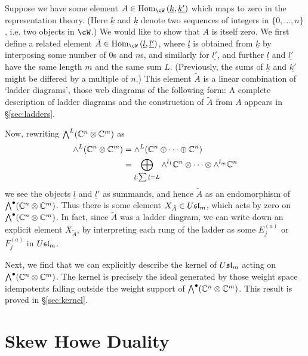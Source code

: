 \documentclass[11pt,leqno]{article}
\begin{document}
Suppose we have some element $A \in \Hom{\cW}{\underline{k}}{\underline{k'}}$ which maps to zero in the representation theory. (Here $\underline{k}$ and $\underline{k}$ denote two sequences of integers in $\{0,\ldots,n\}$, i.e. two objects in $\cW$.) We would like to show that $A$ is itself zero. We first define a related element $\tilde{A} \in \Hom{\cW}{\underline{l}}{\underline{l'}}$, where $\underline{l}$ is obtained from $\underline{k}$ by interposing some number of $0$s and $n$s, and similarly for $\underline{l'}$, and further $\underline{l}$ and $\underline{l'}$ have the same length $m$ and the same sum $L$. (Previously, the sums of $\underline{k}$ and $\underline{k'}$ might be differed by a multiple of $n$.) This element $\tilde{A}$ is a linear combination of `ladder diagrams', those web diagrams of the following form:
A complete description of ladder diagrams and the construction of $\tilde{A}$ from $A$ appears in \S \ref{sec:ladders}.

Now, rewriting $\bigwedge^L(\mathbb C^n \otimes \mathbb C^m)$ as
\begin{align*}
\wedge^L(\mathbb C^n \otimes \mathbb C^m) & = \wedge^L(\mathbb C^n \oplus \cdots \oplus \mathbb C^n) \\
		& = \bigoplus_{\underline{l}: \sum \underline{l} = L} \wedge^{l_1} \mathbb C^n \otimes \cdots \otimes \wedge^{l_m} \mathbb C^n
\end{align*}
we see the objects $\underline{l}$ and $\underline{l}'$ as summands, and hence $\tilde{A}$ as an endomorphism of $\bigwedge^\bullet(\mathbb C^n \otimes \mathbb C^m)$. Thus there is some element $X_{\tilde{A}} \in U\mathfrak{sl}_{m}$, which acts by zero on $\bigwedge^\bullet(\mathbb C^n \otimes \mathbb C^m)$. In fact, since $\tilde{A}$ was a ladder diagram, we can write down an explicit element $X_{\tilde{A}}$, by interpreting each rung of the ladder as some $E^{(a)}_j$ or $F^{(a)}_j$ in $U\mathfrak{sl}_{m}$. 

Next, we find that we can explicitly describe the kernel of $U\mathfrak{sl}_{m}$ acting on $\bigwedge^\bullet(\mathbb C^n \otimes \mathbb C^m)$. The kernel is precisely the ideal generated by those weight space idempotents falling outside the weight support of $\bigwedge^\bullet(\mathbb C^n \otimes \mathbb C^m)$.  This result is proved in \S \ref{sec:kernel}.

\section{Skew Howe Duality}
\label{sec:skew-howe}
\end{document}
